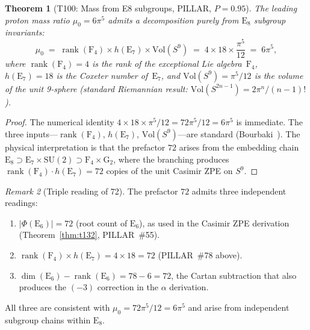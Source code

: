 \documentclass[aps,prd,twocolumn,superscriptaddress,floatfix,nofootinbib]{revtex4-2}
\newtheorem{theorem}{Theorem}
\theoremstyle{definition}
\theoremstyle{remark}
\newtheorem{remark}[theorem]{Remark}
\begin{document}
\begin{theorem}[T100: Mass from E8 subgroups, PILLAR, $P{=}0.95$]
\label{thm:T100}
The leading proton mass ratio $\mu_0 = 6\pi^5$ admits a
decomposition purely from $\mathrm{E}_8$ subgroup invariants:
\begin{equation}
\label{eq:mass-e8-subgroups}
  \mu_0
  \;=\; \operatorname{rank}(\mathrm{F}_4)
        \times h(\mathrm{E}_7)
        \times \mathrm{Vol}(S^9)
  \;=\; 4 \times 18 \times \frac{\pi^5}{12}
  \;=\; 6\pi^5,
\end{equation}
where $\operatorname{rank}(\mathrm{F}_4) = 4$ is the rank of the
exceptional Lie algebra~$\mathrm{F}_4$,
$h(\mathrm{E}_7) = 18$ is the Coxeter number of~$\mathrm{E}_7$,
and $\mathrm{Vol}(S^9) = \pi^5/12$ is the volume of the
unit 9-sphere (standard Riemannian result:
$\mathrm{Vol}(S^{2n-1}) = 2\pi^n/(n{-}1)!$).
\end{theorem}

\begin{proof}
The numerical identity $4 \times 18 \times \pi^5/12
= 72\pi^5/12 = 6\pi^5$ is immediate.
The three inputs---$\operatorname{rank}(\mathrm{F}_4)$,
$h(\mathrm{E}_7)$, $\mathrm{Vol}(S^9)$---are standard
(Bourbaki~\cite{bourbaki-lie456}).
The physical interpretation is that the prefactor $72$
arises from the embedding chain
$\mathrm{E}_8 \supset \mathrm{E}_7 \times \mathrm{SU}(2)
\supset \mathrm{F}_4 \times \mathrm{G}_2$,
where the branching produces
$\operatorname{rank}(\mathrm{F}_4) \cdot h(\mathrm{E}_7) = 72$
copies of the unit Casimir ZPE on $S^9$.
\end{proof}

\begin{remark}[Triple reading of 72]
\label{rem:triple-reading-72}
The prefactor $72$ admits three independent readings:
\begin{enumerate}[nosep]
\item $|\Phi(\mathrm{E}_6)| = 72$ (root count of $\mathrm{E}_6$),
as used in the Casimir ZPE derivation
(Theorem~\ref{thm:t132}, PILLAR~\#55).
\item $\operatorname{rank}(\mathrm{F}_4)\times h(\mathrm{E}_7)
= 4 \times 18 = 72$ (PILLAR~\#78 above).
\item $\dim(\mathrm{E}_6) - \operatorname{rank}(\mathrm{E}_6)
= 78 - 6 = 72$, the Cartan subtraction that also produces
the $(-3)$ correction in the $\alpha$ derivation.
\end{enumerate}
All three are consistent with $\mu_0 = 72\pi^5/12 = 6\pi^5$
and arise from independent subgroup chains within $\mathrm{E}_8$.
\end{remark}
\end{document}
